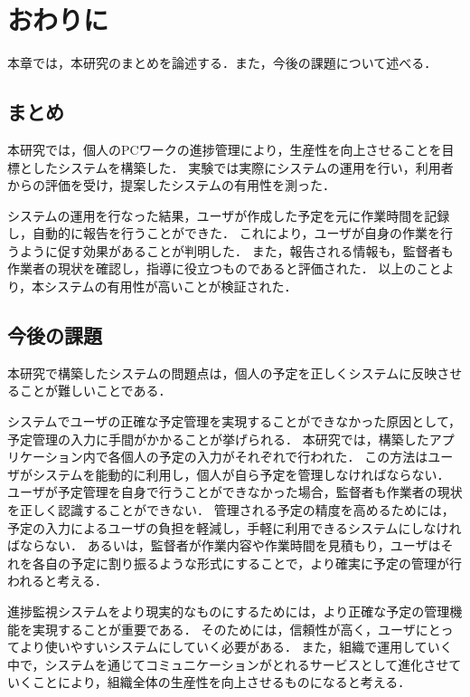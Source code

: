 \chapter{おわりに}
本章では，本研究のまとめを論述する．また，今後の課題について述べる．

\section{まとめ}
本研究では，個人のPCワークの進捗管理により，生産性を向上させることを目標としたシステムを構築した．
実験では実際にシステムの運用を行い，利用者からの評価を受け，提案したシステムの有用性を測った．

システムの運用を行なった結果，ユーザが作成した予定を元に作業時間を記録し，自動的に報告を行うことができた．
これにより，ユーザが自身の作業を行うように促す効果があることが判明した．
また，報告される情報も，監督者も作業者の現状を確認し，指導に役立つものであると評価された．
以上のことより，本システムの有用性が高いことが検証された．

\section{今後の課題}
本研究で構築したシステムの問題点は，個人の予定を正しくシステムに反映させることが難しいことである．

システムでユーザの正確な予定管理を実現することができなかった原因として，予定管理の入力に手間がかかることが挙げられる．
本研究では，構築したアプリケーション内で各個人の予定の入力がそれぞれで行われた．
この方法はユーザがシステムを能動的に利用し，個人が自ら予定を管理しなければならない．
ユーザが予定管理を自身で行うことができなかった場合，監督者も作業者の現状を正しく認識することができない．
管理される予定の精度を高めるためには，予定の入力によるユーザの負担を軽減し，手軽に利用できるシステムにしなければならない．
あるいは，監督者が作業内容や作業時間を見積もり，ユーザはそれを各自の予定に割り振るような形式にすることで，より確実に予定の管理が行われると考える．

進捗監視システムをより現実的なものにするためには，より正確な予定の管理機能を実現することが重要である．
そのためには，信頼性が高く，ユーザにとってより使いやすいシステムにしていく必要がある．
また，組織で運用していく中で，システムを通じてコミュニケーションがとれるサービスとして進化させていくことにより，組織全体の生産性を向上させるものになると考える．

